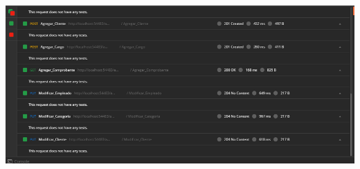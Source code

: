 \documentclass[12pt,letterpaper]{article}
\begin{document}
\begin{center}
    \includegraphics[width=18cm, height=10cm]{img/api4.png}  
\end{center}
\end{document}
